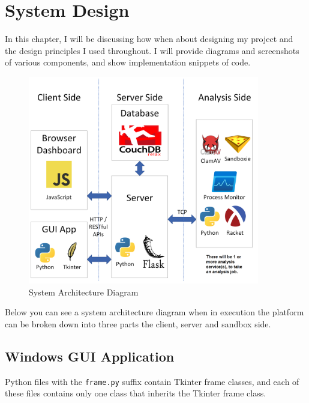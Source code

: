 \chapter{System Design}

In this chapter, I will be discussing how when about designing my project
and the design principles I used throughout.
I will provide diagrams and screenshots of various components,
and show implementation snippets of code.

\begin{figure}[h!]
    \includegraphics[width=0.9\textwidth]{images/diagrams/architecture}
    \caption{System Architecture Diagram}
    \label{image:sysArchitecture}
\end{figure}

Below you can see a system architecture diagram when in execution the platform can be broken down into three parts the client, server and sandbox side.

\section{Windows GUI Application}
Python files with the \texttt{frame.py} suffix contain Tkinter frame classes,
and each of these files contains only one class that inherits the Tkinter frame class.

